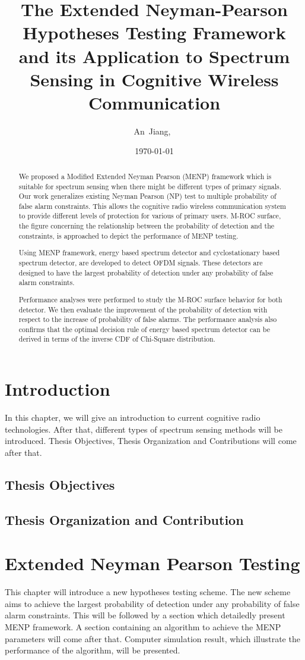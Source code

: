 \documentclass{article}
\author{An~Jiang,~
    }
\title{The Extended Neyman-Pearson Hypotheses Testing Framework and its Application to Spectrum Sensing in Cognitive Wireless Communication}
\date{\today}
\begin{document}
\begin{spacing}{2.0}
\maketitle
\begin{abstract}
We proposed a Modified Extended Neyman Pearson (MENP) framework which is suitable for spectrum sensing when there might be different types of primary signals. Our work generalizes existing Neyman Pearson (NP) test to multiple probability of false alarm constraints. This allows the cognitive radio wireless communication system to provide different levels of protection for various of primary users.  
M-ROC surface, the figure concerning the relationship between the probability of detection and the constraints, is approached to depict the performance of MENP testing.   

Using MENP framework, energy based spectrum detector and cyclostationary based spectrum detector, are developed to detect OFDM signals. These detectors are designed to have the largest probability of detection under any probability of false alarm constraints.  

Performance analyses were performed to study the M-ROC surface behavior for both detector. We then evaluate the improvement of the probability of detection with respect to the increase of probability of false alarms.  
The performance analysis also confirms that the optimal decision rule of energy based spectrum detector can be derived in terms of the inverse CDF of Chi-Square distribution.  
\end{abstract}

\section{Introduction}
In this chapter, we will give an introduction to current cognitive radio technologies. After that, different types of spectrum sensing methods will be introduced. Thesis Objectives, Thesis Organization and Contributions will come after that.
\subsection{Thesis Objectives}
\subsection{Thesis Organization and Contribution}
\newpage
\section{Extended Neyman Pearson Testing }
This chapter will introduce a new hypotheses testing scheme. The new scheme aims to achieve the largest probability of detection under any probability of false alarm constraints. This will be followed by a section which detailedly present MENP framework. A section containing an algorithm to achieve the MENP parameters will come after that. Computer simulation result, which illustrate the performance of the algorithm, will be presented.  

\end{spacing}
\end{document}
